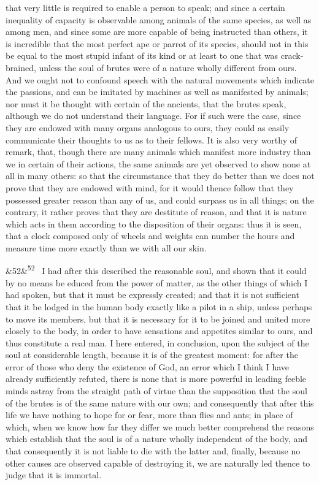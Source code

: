 \documentclass[12pt]{article}
\newcommand{\para}[1][]{\par\noindent\ifx&#1&\else\textsuperscript{\footnotesize #1}~\fi}
\begin{document}
that very little is required to enable a person to speak; and since a certain inequality of capacity is observable among animals of the same species, as well as among men, and since some are more capable of being instructed than others, it is incredible that the most perfect ape or parrot of its species, should not in this be equal to the most stupid infant of its kind or at least to one that was crack-brained, unless the soul of brutes were of a nature wholly different from ours. And we ought not to confound speech with the natural movements which indicate the passions, and can be imitated by machines as well as manifested by animals; nor must it be thought with certain of the ancients, that the brutes speak, although we do not understand their language. For if such were the case, since they are endowed with many organs analogous to ours, they could as easily communicate their thoughts to us as to their fellows. It is also very worthy of remark, that, though there are many animals which manifest more industry than we in certain of their actions, the same animals are yet observed to show none at all in many others: so that the circumstance that they do better than we does not prove that they are endowed with mind, for it would thence follow that they possessed greater reason than any of us, and could surpass us in all things; on the contrary, it rather proves that they are destitute of reason, and that it is nature which acts in them according to the disposition of their organs: thus it is seen, that a clock composed only of wheels and weights can number the hours and measure time more exactly than we with all our skin.

\para[52] I had after this described the reasonable soul, and shown that it could by no means be educed from the power of matter, as the other things of which I had spoken, but that it must be expressly created; and that it is not sufficient that it be lodged in the human body exactly like a pilot in a ship, unless perhaps to move its members, but that it is necessary for it to be joined and united more closely to the body, in order to have sensations and appetites similar to ours, and thus constitute a real man. I here entered, in conclusion, upon the subject of the soul at considerable length, because it is of the greatest moment: for after the error of those who deny the existence of God, an error which I think I have already sufficiently refuted, there is none that is more powerful in leading feeble minds astray from the straight path of virtue than the supposition that the soul of the brutes is of the same nature with our own; and consequently that after this life we have nothing to hope for or fear, more than flies and ants; in place of which, when we know how far they differ we much better comprehend the reasons which establish that the soul is of a nature wholly independent of the body, and that consequently it is not liable to die with the latter and, finally, because no other causes are observed capable of destroying it, we are naturally led thence to judge that it is immortal.
\end{document}
